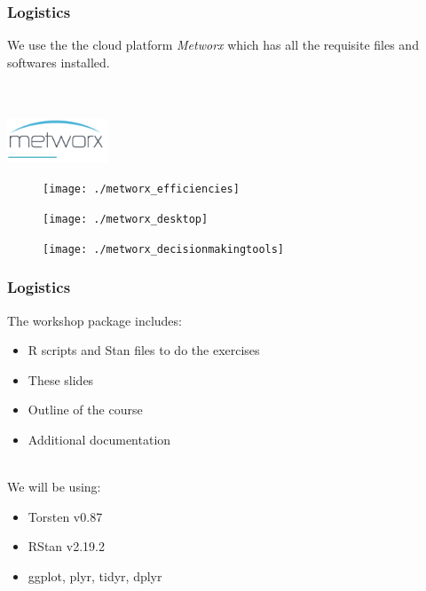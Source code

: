 \documentclass[xcolor=table]{beamer}
\begin{document}
\begin{frame}
  \frametitle{Logistics}
  
  We use the the cloud platform \textit{Metworx}
  which has all the requisite files and softwares installed. \\ \ \\ \ \\
  
  \begin{center}
    \includegraphics[width=3cm]{../metworx}
  \end{center}

  \begin{figure}
    \centering
    \begin{minipage}{0.3\textwidth}
      \centering
      \texttt{[image: ./metworx\_efficiencies]}
    \end{minipage}
    \begin{minipage}{0.3\textwidth}
      \centering
      \texttt{[image: ./metworx\_desktop]}
    \end{minipage}
    \begin{minipage}{0.3\textwidth}
      \centering
      \texttt{[image: ./metworx\_decisionmakingtools]}
    \end{minipage}
  \end{figure}
  
\end{frame}

\begin{frame}
  \frametitle{Logistics}

  The workshop package includes:
  \begin{itemize}
    \item R scripts and Stan files to do the exercises
    \item These slides
    \item Outline of the course
    \item Additional documentation
  \end{itemize}
  
  \ \\
  We will be using:
  \begin{itemize}
    \item Torsten v0.87
    \item RStan v2.19.2
    \item ggplot, plyr, tidyr, dplyr
  \end{itemize}

\end{frame}
\end{document}
